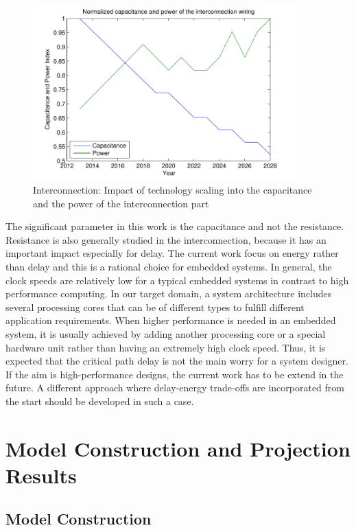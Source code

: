  \begin{figure}
 \centering
 \includegraphics[width =0.9\textwidth]{E/intpower.pdf}
  \caption{Interconnection: Impact of technology scaling into the capacitance and the power of the interconnection part}
 \label{fig:intpowerE}
 \end{figure}

The significant parameter in this work is the capacitance and not the resistance.
Resistance is also generally studied in the interconnection, because it has an important impact especially for
delay. 
The current work focus on energy rather than delay and this is a rational choice for embedded systems.
In general, the clock speeds are relatively low for a typical embedded systems in contrast to high performance computing.
In our target domain, a system architecture includes several processing cores that can be of different types to fulfill different application requirements.
When higher performance is needed in an embedded system, it is usually achieved by adding another processing core or a special hardware unit rather than having an extremely high clock speed.
Thus, it is expected that the critical path delay is not the main worry for a system designer.
If the aim is high-performance designs, the current work has to be extend in the future.
A different approach where delay-energy trade-offs are incorporated
from the start should be developed in such a case.

\section{Model Construction and Projection Results}
\label{resultsE}


\subsection{Model Construction}

